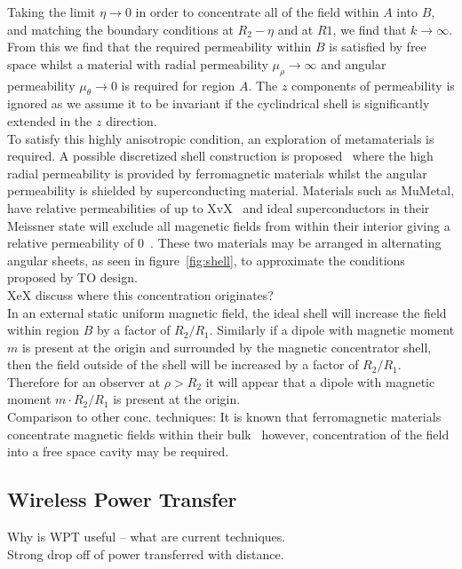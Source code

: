 \documentclass[11pt]{iopart}
\begin{document}
Taking the limit $\eta \rightarrow 0$ in order to concentrate all of
the field within $A$ into $B$, and matching the boundary conditions at
$R_2-\eta$ and at $R1$, we find that $k \rightarrow \infty$. From this
we find that the required permeability within $B$ is satisfied by free
space whilst a material with radial permeability $\mu_\rho \rightarrow
\infty$ and angular permeability $\mu_\theta \rightarrow 0$ is
required for region $A$. The $z$ components of permeability is ignored
as we assume it to be invariant if the cyclindrical shell is
significantly extended in the $z$ direction.\\
To satisfy this highly anisotropic condition, an exploration of
metamaterials is required. A possible discretized shell construction
is proposed~\cite{PRATT} where the high radial permeability is
provided by ferromagnetic materials whilst the angular permeability is
shielded by superconducting material. Materials such as MuMetal, have
relative permeabilities of up to XvX~\cite{MUMETAL} and ideal
superconductors in their Meissner state will exclude all magenetic
fields from within their interior giving a relative permeability of
$0$~\cite{Meissner}.  These two materials may be arranged in
alternating angular sheets, as seen in figure~\ref{fig:shell}, to
approximate the conditions proposed by TO design. \\
XeX discuss where this concentration originates? \\
In an external static uniform magnetic field, the ideal shell will
increase the field within region $B$ by a factor of
$R_2/R_1$. Similarly if a dipole with magnetic moment $m$ is present
at the origin and surrounded by the magnetic concentrator shell, then
the field outside of the shell will be increased by a factor of
$R_2/R_1$. Therefore for an observer at $\rho > R_2$ it will appear
that a dipole with magnetic moment $m\cdot R_2/R_1$ is present at the
origin.\\
Comparison to other conc. techniques:
It is known that ferromagnetic materials concentrate magnetic fields
within their bulk~\cite{ferro} however, concentration of the field
into a free space cavity may be required.

\subsection{Wireless Power Transfer}
Why is WPT useful -- what are current techniques. \\
Strong drop off of power transferred with distance.\\
\end{document}

